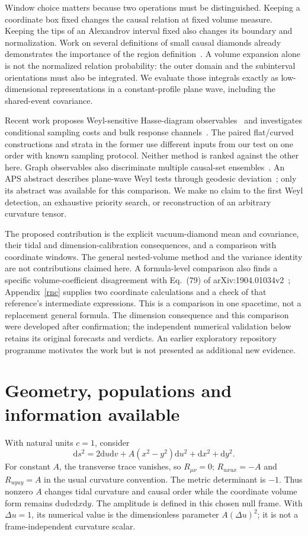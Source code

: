 \documentclass[11pt,a4paper]{article}
\newcommand{\dd}{\mathrm d}
\begin{document}
Window choice matters because two operations must be distinguished. Keeping a
coordinate box fixed changes the causal relation at fixed volume measure.
Keeping the tips of an Alexandrov interval fixed also changes its boundary and
normalization. Work on several definitions of small causal diamonds already
demonstrates the importance of the region definition~\cite{wang}.
A volume expansion alone is not the normalized relation probability: the
outer domain and the subinterval orientations must also be integrated.
We evaluate those integrals exactly as low-dimensional representations in a
constant-profile plane wave, including the shared-event covariance.

Recent work proposes Weyl-sensitive Hasse-diagram observables~\cite{alfyorov}
and investigates conditional sampling costs and bulk response channels~\cite{ghosh}.
The paired flat/curved constructions and strata in the former use different
inputs from our test on one order with known sampling protocol. Neither method
is ranked against the other here. Graph observables also discriminate multiple
causal-set ensembles~\cite{eichhorn}. An APS abstract describes plane-wave Weyl
tests through geodesic deviation~\cite{ahmed}; only its abstract was available
for this comparison. We make no claim to the first Weyl detection, an exhaustive
priority search, or reconstruction of an arbitrary curvature tensor.

The proposed contribution is the explicit vacuum-diamond mean and covariance,
their tidal and dimension-calibration consequences, and a comparison with
coordinate windows. The general nested-volume method and the variance identity
are not contributions claimed here. A formula-level comparison also finds a
specific volume-coefficient disagreement with Eq.~(79) of
arXiv:1904.01034v2~\cite{wang}; Appendix~\ref{rnc} supplies two coordinate
calculations and a check of that reference's intermediate expressions.
This is a comparison in one spacetime, not a replacement general formula.
The dimension consequence and this comparison were developed after confirmation;
the independent numerical validation below retains its original forecasts and
verdicts. An earlier exploratory repository programme motivates the work but is
not presented as additional new evidence.

\section{Geometry, populations and information available}
With natural units $c=1$, consider
\begin{equation}
 \dd s^2=2\dd u\dd v+A(x^2-y^2)\dd u^2+\dd x^2+\dd y^2 . \label{metric}
\end{equation}
For constant $A$, the transverse trace vanishes, so $R_{\mu\nu}=0$;
$R_{uxux}=-A$ and $R_{uyuy}=A$ in the usual curvature convention.
The metric determinant is $-1$. Thus nonzero $A$ changes tidal curvature and
causal order while the coordinate volume form remains
$\dd u\dd v\dd x\dd y$. The amplitude is defined in this chosen null frame.
With $\Delta u=1$, its numerical value is the dimensionless parameter
$A(\Delta u)^2$; it is not a frame-independent curvature scalar.
\end{document}
